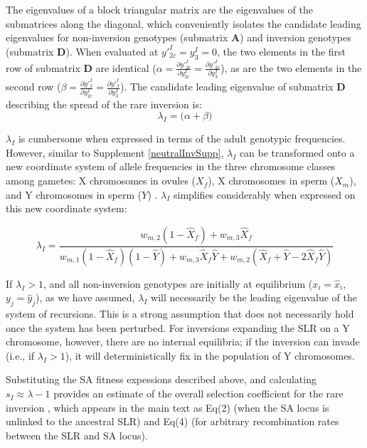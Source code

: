 \documentclass{article}
\begin{document}
\begin{appendices}
\noindent The eigenvalues of a block triangular matrix are the eigenvalues of the submatrices along the diagonal, which conveniently isolates the candidate leading eigenvalues for non-inversion genotypes (submatrix $\mathbf{A}$) and inversion genotypes (submatrix $\mathbf{D}$). When evaluated at $y'^I_{2c} = y^I_{3} = 0$, the two elements in the first row of submatrix $\mathbf{D}$ are identical ($ \alpha = \frac{\partial y'^I_{2c}}{\partial y^I_{2c}} = \frac{\partial y'^I_{2c}}{\partial y^I_{3}}$), as are the two elements in the second row ($\beta = \frac{\partial y'^I_{3}}{\partial y^I_{2c}} = \frac{\partial y'^I_{3}}{\partial y^I_{3}}$). The candidate leading eigenvalue of submatrix $\mathbf{D}$ describing the spread of the rare inversion is:
\begin{equation}
	\lambda_{I} = \big( \alpha + \beta \big)
\end{equation}

\noindent $\lambda_I$ is cumbersome when expressed in terms of the adult genotypic frequencies. However, similar to Supplement \ref{neutralInvSupp}, $\lambda_I$ can be transformed onto a new coordinate system of allele frequencies in the three chromosome classes among gametes: X chromosomes in ovules ($X_f$), X chromosomes in sperm ($X_m$), and Y chromosomes in sperm ($Y$) \citep{Clark1987,Otto2011,Otto2014}. $\lambda_I$ simplifies considerably when expressed on this new coordinate system:

\begin{equation}
	\lambda_I = \frac{w_{m,2}(1 - \hat{X}_f) + w_{m,3} \hat{X}_f} {w_{m,1}(1 - \hat{X}_f)(1 - \hat{Y}) + w_{m,3} \hat{X}_f \hat{Y} + w_{m,2} (\hat{X}_f + \hat{Y} - 2 \hat{X}_f \hat{Y})}
\end{equation}

\noindent If $\lambda_I > 1$, and all non-inversion genotypes are initially at equilibrium ($x_i = \hat{x}_i$, $y_j = \hat{y}_j$), as we have assumed, $\lambda_I$ will necessarily be the leading eigenvalue of the system of recursions. This is a strong assumption that does not necessarily hold once the system has been perturbed. 
For inversions expanding the SLR on a Y chromosome, however, there are no internal equilibria; if the inversion can invade (i.e., if $\lambda_I > 1$), it will deterministically fix in the population of Y chromosomes. 

Substituting the SA fitness expessions described above, and calculating $s_I \approx \lambda - 1$ provides an estimate of the overall selection coefficient for the rare inversion \citep{OttoYong2002}, which appears in the main text as Eq(2) (when the SA locus is unlinked to the ancestral SLR) and Eq(4) (for arbitrary recombination rates between the SLR and SA locus). 




\end{appendices}
\end{document}
